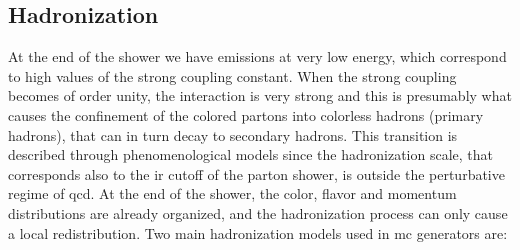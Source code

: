 \subsection{Hadronization}

At the end of the shower we have emissions at very low energy, which correspond to high values of the strong coupling constant. 
When the strong coupling becomes of order unity, the interaction is very strong and this is presumably what causes the confinement of the colored partons into colorless hadrons (primary hadrons), 
that can in turn decay to secondary hadrons. This transition is described through phenomenological models since the hadronization scale, that corresponds also to the \gls{ir} cutoff of the parton shower, is outside the perturbative regime of \gls{qcd}. At the end of the shower, the color, flavor and momentum distributions are already organized, and the hadronization process can only cause a local redistribution.
Two main hadronization models used in \gls{mc} generators are:


